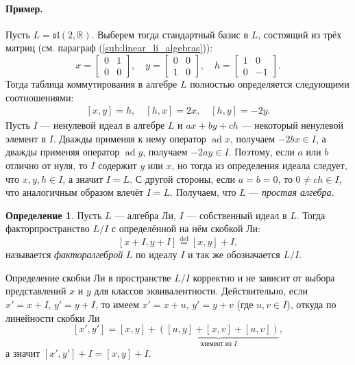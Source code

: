 \documentclass[a4paper, 12pt]{article}
\theoremstyle{definition}
\newtheorem{definition}{Определение}[section]
\begin{document}
\paragraph{Пример.} Пусть \({ L = \mathfrak{sl}(2, \mathbb R) }\). Выберем тогда стандартный базис в \({ L }\), состоящий из трёх матриц (см. параграф (\ref{sub:linear_li_algebras})):
\[
    x = \begin{bmatrix}
        0 & 1 \\
        0 & 0
    \end{bmatrix}, \quad
    y = \begin{bmatrix}
        0 & 0 \\
        1 & 0
    \end{bmatrix}, \quad
    h = \begin{bmatrix}
        1 & 0 \\
        0 & -1
    \end{bmatrix}.
\]
Тогда таблица коммутирования в алгебре \({ L }\) полностью определяется следующими соотношениями:
\[
    \begin{gathered}
        [x, y] = h, \quad  [h, x] = 2x, \quad [h, y] = -2y.
    \end{gathered}
\]
Пусть \({ I }\) --- ненулевой идеал в алгебре \({ L }\) и \({ ax + by + ch }\) --- некоторый ненулевой элемент в \({ I }\). Дважды применяя к нему оператор \({ \operatorname{ad} x }\), получаем \({ -2b x \in I }\), а дважды применяя оператор \({ \operatorname{ad} y }\), получаем \({ -2ay \in I }\). Поэтому, если \({ a }\) или \({ b }\) отлично от нуля, то \({ I }\) содержит \({ y }\) или \({ x }\), но тогда из определения идеала следует, что \({ x, y, h \in I }\), а значит \({ I = L }\). С другой стороны, если \({ a = b = 0 }\), то \({ 0 \neq ch \in I }\), что аналогичным образом влечёт \({ I = L }\). Получаем, что \({ L }\) --- \textit{простая алгебра}.

\begin{definition}
    Пусть \({ L }\) --- алгебра Ли, \({ I }\) --- собственный идеал в \({ L }\). Тогда факторпространство \({ L / I }\) с определённой на нём скобкой Ли:
    \[
        [x + I, y + I] \overset{\text{def}}= [x, y] + I,
    \]
    называется \textit{факторалгеброй} \({ L }\) по идеалу \({ I }\) и так же обозначается \({ L / I }\).
\end{definition}

Определение скобки Ли в пространстве \({ L / I }\) корректно и не зависит от выбора представлений \({ x }\) и \({ y }\) для классов эквивалентности. Действительно, если \({ x' = x + I }\), \({ y' = y + I }\), то имеем \({ x' = x + u }\), \({ y' = y + v }\) (где \({ u, v \in I }\)), откуда по линейности скобки Ли
\[
    [x', y'] = [x, y] + \underbrace{([u, y] + [x, v] + [u, v])}_{\text{элемент из \({ I }\)}},
\]
а значит \({ [x', y'] + I = [x, y] + I }\).
\end{document}
